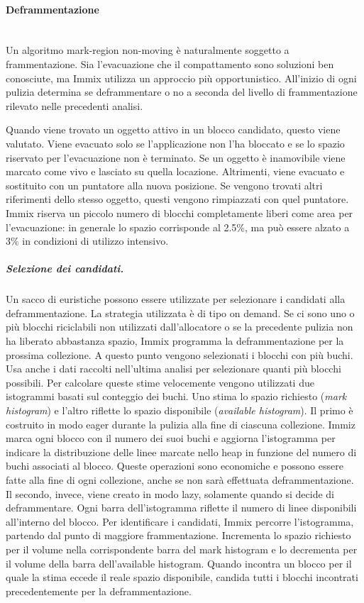 \paragraph{Deframmentazione} \mbox{} \\
Un algoritmo mark-region non-moving è naturalmente soggetto a frammentazione. Sia l'evacuazione che il compattamento sono soluzioni ben conosciute, ma Immix utilizza un approccio più opportunistico. All'inizio di ogni pulizia determina se deframmentare o no a seconda del livello di frammentazione rilevato nelle precedenti analisi. 

Quando viene trovato un oggetto attivo in un blocco candidato, questo viene valutato. Viene evacuato solo se l'applicazione non l'ha bloccato e se lo spazio riservato per l'evacuazione non è terminato. Se un oggetto è inamovibile viene marcato come vivo e lasciato su quella locazione. Altrimenti, viene evacuato e sostituito con un puntatore alla nuova posizione. Se vengono trovati altri riferimenti dello stesso oggetto, questi vengono rimpiazzati con quel puntatore. Immix riserva un piccolo numero di blocchi completamente liberi come area per l'evacuazione: in generale lo spazio corrisponde al 2.5\%, ma può essere alzato a 3\% in condizioni di utilizzo intensivo.

\subparagraph{Selezione dei candidati.} Un sacco di euristiche possono essere utilizzate per selezionare i candidati alla deframmentazione. La strategia utilizzata è di tipo on demand. Se ci sono uno o più blocchi riciclabili non utilizzati dall'allocatore o se la precedente pulizia non ha liberato abbastanza spazio, Immix programma la deframmentazione per la prossima collezione. A questo punto vengono selezionati i blocchi con più buchi. Usa anche i dati raccolti nell'ultima analisi per selezionare quanti più blocchi possibili. Per calcolare queste stime velocemente vengono utilizzati due istogrammi basati sul conteggio dei buchi. Uno stima lo spazio richiesto (\textit{mark histogram}) e l'altro riflette lo spazio disponibile (\textit{available histogram}). Il primo è costruito in modo eager durante la pulizia alla fine di ciascuna collezione. Immiz marca ogni blocco con il numero dei suoi buchi e aggiorna l'istogramma per indicare la distribuzione delle linee marcate nello heap in funzione del numero di buchi associati al blocco. Queste operazioni sono economiche e possono essere fatte alla fine di ogni collezione, anche se non sarà effettuata deframmentazione. Il secondo, invece, viene creato in modo lazy, solamente quando si decide di deframmentare. Ogni barra dell'istogramma riflette il numero di linee disponibili all'interno del blocco. Per identificare i candidati, Immix percorre l'istogramma, partendo dal punto di maggiore frammentazione. Incrementa lo spazio richiesto per il volume nella corrispondente barra del mark histogram e lo decrementa per il volume della barra dell'available histogram. Quando incontra un blocco per il quale la stima eccede il reale spazio disponibile, candida tutti i blocchi incontrati precedentemente per la deframmentazione. 

